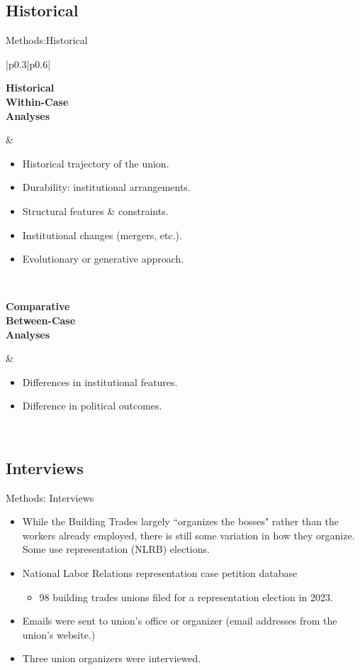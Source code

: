 \documentclass{beamer}
\begin{document}
\subsection{Historical}
\begin{frame}{Methods:Historical}
\setlength{\arrayrulewidth}{0.0pt} %
\begin{tabular}{|p{0.3\textwidth}|p{0.6\textwidth}|}
\hline
\begin{minipage}[t][0.2\textheight][t]{\linewidth}
\textbf{Historical\\
Within-Case\\
Analyses}
\end{minipage}
&
\begin{itemize}
    \item Historical trajectory of the union.
    \item Durability: institutional arrangements.
    \item Structural features \& constraints.
    \item Institutional changes (mergers, etc.).
    \item Evolutionary or generative approach. %
\end{itemize}
\\
\hline
\begin{minipage}[c][0.2\textheight][b]{\linewidth}
\textbf{Comparative\\
Between-Case\\
Analyses}
\end{minipage}
&
\begin{itemize}
    \item Differences in institutional features.
    \item Difference in political outcomes.
\end{itemize}
\\
\hline
\end{tabular}
\end{frame}

\subsection{Interviews}
\begin{frame}{Methods: Interviews}
\begin{itemize}
	\item While the Building Trades largely ``organizes the bosses" rather than the workers already employed, there is still some variation in how they organize. Some use representation (NLRB) elections.
	\item National Labor Relations representation case petition database
	\begin{itemize}
		\item 98 building trades unions filed for a representation election in 2023.
	\end{itemize}		 
	\item Emails were sent to union's office or organizer (email addresses from the union's website.)
	\item Three union organizers were interviewed.
\end{itemize}
\end{frame}
\end{document}
